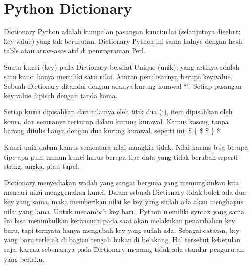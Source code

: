 \section{Python Dictionary}
Dictionary Python adalah kumpulan pasangan kunci:nilai (selanjutnya disebut: key-value) yang tak berurutan. Dictionary Python ini sama halnya dengan hash-table atau array-asosiatif di pemrograman Perl.

Suatu kunci (key) pada Dictionary bersifat Unique (unik), yang artinya adalah satu kunci hanya memiliki satu nilai. Aturan penulisannya berupa key:value. Sebuah Dictionary ditandai dengan adanya kurung kurawal “{}”. Setiap pasangan key:value dipisah dengan tanda koma. 

Setiap kunci dipisahkan dari nilainya oleh titik dua (:), item dipisahkan oleh koma, dan semuanya tertutup dalam kurung kurawal. Kamus kosong tanpa barang ditulis hanya dengan dua kurung kurawal, seperti ini:  \$  \{  \$ \$  \}  \$.

Kunci unik dalam kamus sementara nilai mungkin tidak. Nilai kamus bisa berupa tipe apa pun, namun kunci harus berupa tipe data yang tidak berubah seperti string, angka, atau tupel.

Dictionary menyediakan wadah yang sangat berguna yang memungkinkan kita mencari nilai menggunakan kunci\cite{oliphant2007python}. Dalam sebuah Dictionary tidak boleh ada dua key yang sama, maka memberikan nilai ke key yang sudah ada akan menghapus nilai yang lama. Untuk menambah key baru, Python memiliki syntax yang sama. Ini bisa menimbulkan kerancuan pada saat akan melakukan penambahan key baru, tapi ternyata hanya mengubah key yang sudah ada. Sebagai catatan, key yang baru terletak di bagian tengah bukan di belakang. Hal tersebut kebetulan saja, karena sebenarnya pada Dictionary memang tidak ada standar pengurutan yang berlaku.

